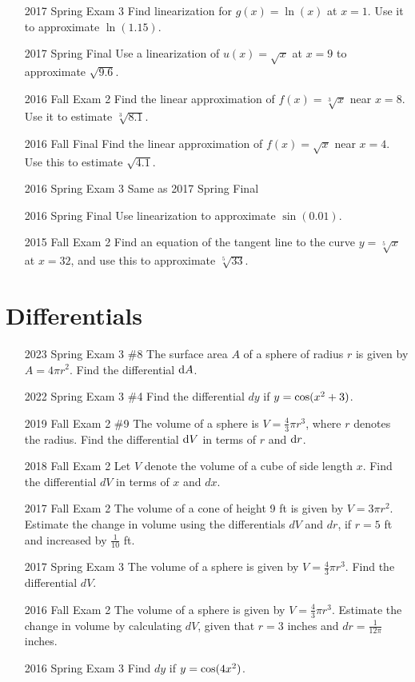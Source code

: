 \documentclass[10pt]{scrartcl}
\theoremstyle{definition}
\begin{document}
\begin{enumerate}
\item [2017 Spring Exam 3] Find linearization for $g(x) = \ln(x)$ at $x = 1$. Use it to approximate $\ln(1.15)$.
\item [2017 Spring Final] Use a linearization of $u(x) = \sqrt{x}$ at $x = 9$ to approximate $\sqrt{9.6}$.
\item [2016 Fall Exam 2] Find the linear approximation of $f(x) = \sqrt[3]{x}$ near $x = 8$. Use it to estimate $\sqrt[3]{8.1}$.
\item [2016 Fall Final] Find the linear approximation of $f(x) = \sqrt{x}$ near $x = 4$. Use this to estimate $\sqrt{4.1}$.
\item [2016 Spring Exam 3] Same as 2017 Spring Final %
\item [2016 Spring Final] Use linearization to approximate $\sin(0.01)$.
\item [2015 Fall Exam 2] Find an equation of the tangent line to the curve $y = \sqrt[5]{x}$ at $x = 32$, and use this to approximate $\sqrt[5]{33}$.
\end{enumerate}

\newpage
\section{Differentials}
\begin{enumerate}
\item [2023 Spring Exam 3 \#8] The surface area $A$ of a sphere of radius $r$ is given by $A = 4\pi r^2$. Find the differential $\dif A$.
\item [2022 Spring Exam 3 \#4] Find the differential $dy$ if $y = \cosine(x^2+3)$.
\item [2019 Fall Exam 2 \#9] The volume of a sphere is $V = \frac43 \pi r^3$, where $r$ denotes the radius. Find the differential $\dif V$ in terms of $r$ and $\dif r$.
\item [2018 Fall Exam 2] Let $V$ denote the volume of a cube of side length $x$. Find the differential $dV$ in terms of $x$ and $dx$.
\item [2017 Fall Exam 2] The volume of a cone of height 9 ft is given by $V = 3\pi r^2$. Estimate the change in volume using the differentials $dV$ and $dr$, if $r = 5$ ft and increased by $\frac{1}{10}$ ft.
\item [2017 Spring Exam 3] The volume of a sphere is given by $V = \frac 43 \pi r^3$. Find the differential $dV$.
\item [2016 Fall Exam 2] The volume of a sphere is given by $V = \frac 43 \pi r^3$. Estimate the change in volume by calculating $dV$, given that $r = 3$ inches and $dr = \frac{1}{12\pi}$ inches.
\item [2016 Spring Exam 3] Find $dy$ if $y = \cosine(4x^2)$.
\end{enumerate}
\end{document}
